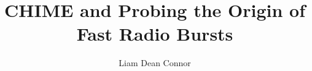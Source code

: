 \documentclass[12pt]{ut-thesis}
\author{Liam Dean Connor}
\title{CHIME and Probing the Origin of Fast Radio Bursts}
\begin{document}
\begin{preliminary}


\maketitle




\end{preliminary}
\end{document}
